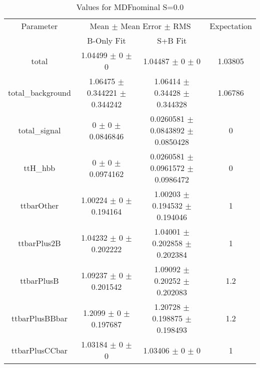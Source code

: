 \begin{table}
\centering
\caption{Values for MDFnominal S=0.0}
\begin{tabular}{cccc}
\toprule
Parameter & \multicolumn{2}{c}{Mean $\pm$ Mean Error $\pm$ RMS} & Expectation\\
 & B-Only Fit & S+B Fit & \\
\midrule
total & \num{1.04499} $\pm$ \num{0} $\pm$ \num{0} & \num{1.04487} $\pm$ \num{0} $\pm$ \num{0} & \num{1.03805}\\
total\_background & \num{1.06475} $\pm$ \num{0.344221} $\pm$ \num{0.344242} & \num{1.06414} $\pm$ \num{0.34428} $\pm$ \num{0.344328} & \num{1.06786}\\
total\_signal & \num{0} $\pm$ \num{0} $\pm$ \num{0.0846846} & \num{0.0260581} $\pm$ \num{0.0843892} $\pm$ \num{0.0850428} & \num{0}\\
ttH\_hbb & \num{0} $\pm$ \num{0} $\pm$ \num{0.0974162} & \num{0.0260581} $\pm$ \num{0.0961572} $\pm$ \num{0.0986472} & \num{0}\\
ttbarOther & \num{1.00224} $\pm$ \num{0} $\pm$ \num{0.194164} & \num{1.00203} $\pm$ \num{0.194532} $\pm$ \num{0.194046} & \num{1}\\
ttbarPlus2B & \num{1.04232} $\pm$ \num{0} $\pm$ \num{0.202222} & \num{1.04001} $\pm$ \num{0.202858} $\pm$ \num{0.202384} & \num{1}\\
ttbarPlusB & \num{1.09237} $\pm$ \num{0} $\pm$ \num{0.201542} & \num{1.09092} $\pm$ \num{0.20252} $\pm$ \num{0.202083} & \num{1.2}\\
ttbarPlusBBbar & \num{1.2099} $\pm$ \num{0} $\pm$ \num{0.197687} & \num{1.20728} $\pm$ \num{0.198875} $\pm$ \num{0.198493} & \num{1.2}\\
ttbarPlusCCbar & \num{1.03184} $\pm$ \num{0} $\pm$ \num{0} & \num{1.03406} $\pm$ \num{0} $\pm$ \num{0} & \num{1}\\
\bottomrule
\end{tabular}
\end{table}